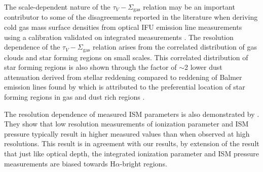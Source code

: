 \documentclass[fleqn,usenatbib]{mnras}
\begin{document}
The scale-dependent nature of the $\tau_V - \Sigma_{\textrm{gas}}$ relation may be an important contributor to some of the disagreements reported in the literature when deriving cold gas mass surface densities from optical IFU emission line measurements using a calibration validated on integrated measurements \cite[e.g.][]{barrera-ballesteros2020, barrera-ballesteros2021}. The resolution dependence of the  $\tau_V - \Sigma_{\textrm{gas}}$ relation arises from the correlated distribution of gas clouds and star forming regions on small scales. This correlated distribution of star forming regions is also shown through the factor of $\sim$2 lower dust attenuation derived from stellar reddening compared to reddening of Balmer emission lines found by \cite{kreckel2013} which is attributed to the preferential location of star forming regions in gas and dust rich regions \citep{calzetti1994, calzetti2000, charlot2000, hao2011}.

The resolution dependence of measured ISM parameters is also demonstrated by \cite{grasha2022}. They show that low resolution measurements of ionization parameter and ISM pressure typically result in higher measured values than when observed at  high resolutions. This result is in agreement with our results, by extension of the result that just like optical depth, the integrated ionization parameter and ISM pressure measurements are biased towards H$\alpha$-bright regions. 
\end{document}
